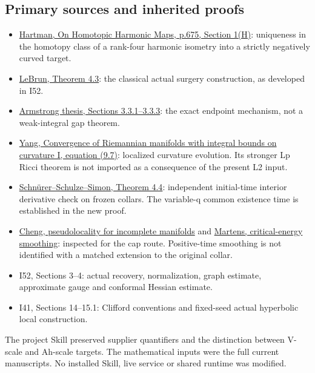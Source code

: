 \documentclass[
  10pt,
]{article}
\providecommand{\tightlist}{%
  \setlength{\itemsep}{0pt}\setlength{\parskip}{0pt}}
\begin{document}
\hypertarget{primary-sources-and-inherited-proofs}{%
\subsection{Primary sources and inherited
proofs}\label{primary-sources-and-inherited-proofs}}

\begin{itemize}
\tightlist
\item
  \href{https://math.jhu.edu/~js/Math646/hartman.harmonic.pdf}{Hartman,
  On Homotopic Harmonic Maps, p.675, Section 1(H)}: uniqueness in the
  homotopy class of a rank-four harmonic isometry into a strictly
  negatively curved target.
\item
  \href{https://arxiv.org/html/math/0003068}{LeBrun, Theorem 4.3}: the
  classical actual surgery construction, as developed in I52.
\item
  \href{https://johnarmstrongmaths.com/publications/resources/thesis.pdf}{Armstrong
  thesis, Sections 3.3.1--3.3.3}: the exact endpoint mechanism, not a
  weak-integral gap theorem.
\item
  \href{https://www.numdam.org/item/10.24033/asens.1644.pdf}{Yang,
  Convergence of Riemannian manifolds with integral bounds on curvature
  I, equation (9.7)}: localized curvature evolution. Its stronger Lp
  Ricci theorem is not imported as a consequence of the present L2
  input.
\item
  \href{https://arxiv.org/pdf/0706.0421}{Schnürer--Schulze--Simon,
  Theorem 4.4}: independent initial-time interior derivative check on
  frozen collars. The variable-q common existence time is established in
  the new proof.
\item
  \href{https://arxiv.org/abs/2210.15397}{Cheng, pseudolocality for
  incomplete manifolds} and
  \href{https://arxiv.org/abs/2408.11115}{Martens, critical-energy
  smoothing}: inspected for the cap route. Positive-time smoothing is
  not identified with a matched extension to the original collar.
\item
  I52, Sections 3--4: actual recovery, normalization, graph estimate,
  approximate gauge and conformal Hessian estimate.
\item
  I41, Sections 14--15.1: Clifford conventions and fixed-seed actual
  hyperbolic local construction.
\end{itemize}

The project Skill preserved supplier quantifiers and the distinction
between V-scale and Ah-scale targets. The mathematical inputs were the
full current manuscripts. No installed Skill, live service or shared
runtime was modified.
\end{document}
